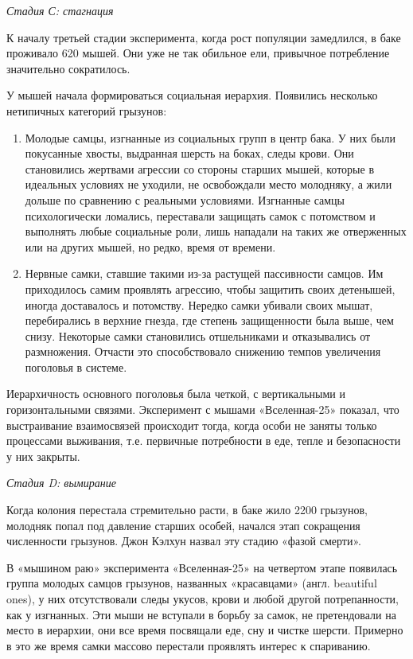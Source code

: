 \textit{Стадия С: стагнация}

К началу третьей стадии эксперимента, когда рост популяции замедлился, в баке проживало 620 мышей. Они уже не так обильное ели, привычное потребление значительно сократилось.

У мышей начала формироваться социальная иерархия. Появились несколько нетипичных категорий грызунов:
\begin{enumerate}
    \item Молодые самцы, изгнанные из социальных групп в центр бака. У них были покусанные хвосты, выдранная шерсть на боках, следы крови. Они становились жертвами агрессии со стороны старших мышей, которые в идеальных условиях не уходили, не освобождали место молодняку, а жили дольше по сравнению с реальными условиями. Изгнанные самцы психологически ломались, переставали защищать самок с потомством и выполнять любые социальные роли, лишь нападали на таких же отверженных или на других мышей, но редко, время от времени.
    \item Нервные самки, ставшие такими из-за растущей пассивности самцов. Им приходилось самим проявлять агрессию, чтобы защитить своих детенышей, иногда доставалось и потомству. Нередко самки убивали своих мышат, перебирались в верхние гнезда, где степень защищенности была выше, чем снизу. Некоторые самки становились отшельниками и отказывались от размножения. Отчасти это способствовало снижению темпов увеличения поголовья в системе.
\end{enumerate}

Иерархичность основного поголовья была четкой, с вертикальными и горизонтальными связями. Эксперимент с мышами «Вселенная-25» показал, что выстраивание взаимосвязей происходит тогда, когда особи не заняты только процессами выживания, т.е. первичные потребности в еде, тепле и безопасности у них закрыты.

\textit{Стадия D: вымирание}

Когда колония перестала стремительно расти, в баке жило 2200 грызунов, молодняк попал под давление старших особей, начался этап сокращения численности грызунов. Джон  Кэлхун назвал эту стадию «фазой смерти».

В «мышином раю» эксперимента «Вселенная-25» на четвертом этапе появилась группа молодых самцов грызунов, названных «красавцами» (англ. beautiful ones), у них отсутствовали следы укусов, крови и любой другой потрепанности, как у изгнанных. Эти мыши не вступали в борьбу за самок, не претендовали на место в иерархии, они все время посвящали еде, сну и чистке шерсти. Примерно в это же время самки массово перестали проявлять интерес к спариванию.


